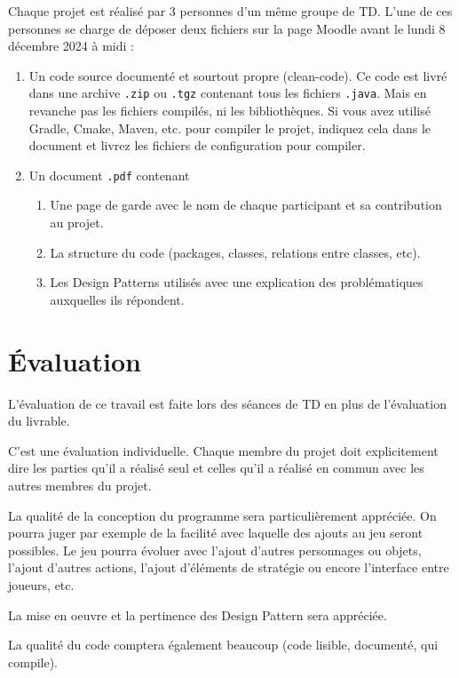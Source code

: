 \documentclass{article}
\begin{document}
Chaque projet est réalisé par 3 personnes d'un même groupe de TD. L’une de ces personnes se charge de déposer deux fichiers sur la page Moodle avant le lundi 8 décembre 2024 à midi :

\begin{enumerate}
    \item Un code source documenté et sourtout propre (clean-code). Ce code est livré dans une archive \texttt{.zip} 
    ou \texttt{.tgz} contenant tous les fichiers \texttt{.java}. 
    Mais en revanche pas les fichiers compilés, ni les bibliothèques.
    Si vous avez utilisé Gradle, Cmake, Maven, etc. pour compiler le projet, indiquez cela dans le document 
    et livrez les fichiers de configuration pour compiler.

    \item Un document \texttt{.pdf} contenant
\begin{enumerate}
\item Une page de garde avec le nom de chaque participant et sa contribution au projet.
\item La structure du code (packages, classes, relations entre classes, etc).
\item Les Design Patterns utilisés avec une explication des problématiques auxquelles ils
répondent.
\end{enumerate}


\end{enumerate}

\section*{Évaluation}

L'évaluation de ce travail est faite lors des séances de TD en plus de l'évaluation du livrable. 

C'est une évaluation individuelle. Chaque membre du projet doit explicitement dire les parties qu'il a
réalisé seul et celles qu'il a réalisé en commun avec les autres membres du projet.

La qualité de la conception du programme sera particulièrement appréciée. On pourra juger par exemple de la facilité avec 
laquelle des ajouts au jeu seront possibles. Le jeu pourra évoluer avec l’ajout d’autres personnages ou objets, l’ajout 
d’autres actions, l’ajout d’éléments de stratégie ou encore l’interface entre joueurs, etc.

La mise en oeuvre et la pertinence des Design Pattern sera appréciée.

La qualité du code comptera également beaucoup (code lisible, documenté, qui compile).
\end{document}
